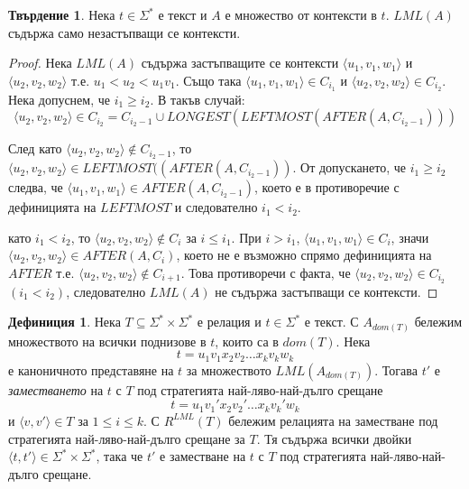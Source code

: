 \documentclass[12pt, oneside]{article}
\theoremstyle{definition}
\newtheorem{definition}{Дефиниция}[section]
\newtheorem{proposition}{Твърдение}[section]
\begin{document}
\begin{proposition}
	Нека \( t \in \Sigma^* \) е текст и \(A\) е множество от контексти в \(t\). \( LML(A) \) съдържа само незастъпващи се контексти.

	\begin{proof}
		Нека \( LML(A) \) съдържа застъпващите се контексти \( \langle u_1, v_1, w_1 \rangle \) и \( \langle u_2, v_2, w_2 \rangle \) т.е. \( u_1 < u_2 < u_1v_1 \). Също така \( \langle u_1, v_1, w_1 \rangle \in C_{i_1} \) и \( \langle u_2, v_2, w_2 \rangle \in C_{i_2} \). Нека допуснем, че \( i_1 \geq i_2 \). В такъв случай:
		\[ \langle u_2, v_2, w_2 \rangle \in C_{i_2} = C_{i_2-1} \cup LONGEST(LEFTMOST(AFTER(A, C_{i_2-1}))) \]

		\noindent След като \( \langle u_2, v_2, w_2 \rangle \notin C_{i_2-1} \), то \( \langle u_2, v_2, w_2 \rangle \in LEFTMOST((AFTER(A, C_{i_2-1})) \).
		От допускането, че \( i_1 \geq i_2 \) следва, че \( \langle u_1, v_1, w_1 \rangle \in AFTER(A,C_{i_2-1}) \), което е в противоречие с дефиницията на \( LEFTMOST \) и следователно \( i_1 < i_2 \).

		 като \( i_1 < i_2 \), то \( \langle u_2, v_2, w_2 \rangle \notin C_i \) за \( i \leq i_1 \). При \( i > i_1 \), \( \langle u_1, v_1, w_1 \rangle \in C_i \), значи \( \langle u_2, v_2, w_2 \rangle \in AFTER(A, C_i) \), което не е възможно спрямо дефиницията на \( AFTER \) т.е. \( \langle u_2, v_2, w_2 \rangle \notin C_{i+1} \). Това противоречи с факта, че \( \langle u_2, v_2, w_2 \rangle \in C_{i_2} \) \( (i_1 < i_2) \), следователно \( LML(A) \) не съдържа застъпващи се контексти.
	\end{proof}
\end{proposition}

\begin{definition}
	Нека \( T \subseteq \Sigma^* \times \Sigma^* \) е релация и \( t \in \Sigma^* \) е текст. С \( A_{dom(T)} \) бележим множеството на всички поднизове в \(t\), които са в \(dom(T)\). Нека \[ t = u_1 v_1 x_2 v_2 \dots x_k v_k w_k \] е каноничното представяне на \(t\) за множеството \( LML(A_{dom(T)}) \). Тогава \(t'\) е \emph{заместването} на \(t\) с \(T\) под стратегията най-ляво-най-дълго срещане \[t = u_1 v_1' x_2 v_2' \dots x_k v_k' w_k\] и \( \langle v, v' \rangle \in T \) за \( 1 \leq i \leq k \). С \( R^{LML}(T) \) бележим релацията на заместване под стратегията най-ляво-най-дълго срещане за \(T\). Тя съдържа всички двойки \( \langle t, t' \rangle \in \Sigma^* \times \Sigma^* \), така че \( t' \) е заместване на \( t \) с \(T\) под стратегията най-ляво-най-дълго срещане.
\end{definition}
\end{document}
